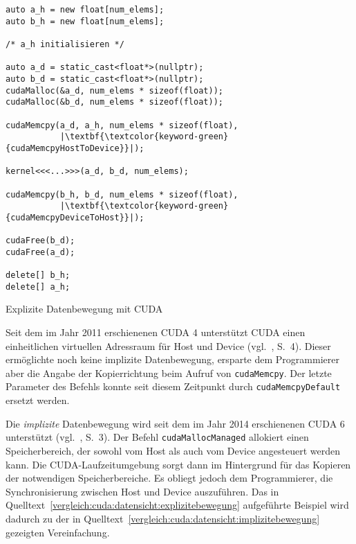 \begin{code}
    \begin{verbatim}
auto a_h = new float[num_elems];
auto b_h = new float[num_elems];

/* a_h initialisieren */

auto a_d = static_cast<float*>(nullptr);
auto b_d = static_cast<float*>(nullptr);
cudaMalloc(&a_d, num_elems * sizeof(float));
cudaMalloc(&b_d, num_elems * sizeof(float));

cudaMemcpy(a_d, a_h, num_elems * sizeof(float),
           |\textbf{\textcolor{keyword-green}{cudaMemcpyHostToDevice}}|);

kernel<<<...>>>(a_d, b_d, num_elems);

cudaMemcpy(b_h, b_d, num_elems * sizeof(float),
           |\textbf{\textcolor{keyword-green}{cudaMemcpyDeviceToHost}}|);

cudaFree(b_d);
cudaFree(a_d);

delete[] b_h;
delete[] a_h;
    \end{verbatim}
    \caption{Explizite Datenbewegung mit CUDA}
    \label{vergleich:cuda:datensicht:explizitebewegung}
\end{code}

Seit dem im Jahr 2011 erschienenen CUDA 4 unterstützt CUDA einen einheitlichen
virtuellen Adressraum für Host und Device (vgl.~\cite{cuda2011}, S.\ 4). Dieser
ermöglichte noch keine implizite Datenbewegung, ersparte dem Programmierer
aber die Angabe der Kopierrichtung beim Aufruf von
\texttt{cudaMemcpy}. Der letzte Parameter des Befehls konnte seit
diesem Zeitpunkt durch \texttt{cudaMemcpyDefault} ersetzt werden.

Die \textit{implizite} Datenbewegung wird seit dem im Jahr 2014 erschienenen
CUDA 6 unterstützt (vgl.~\cite{cuda2014}, S.\ 3). Der Befehl
\texttt{cudaMallocManaged} allokiert einen Speicherbereich, der sowohl
vom Host als auch vom Device angesteuert werden kann. Die CUDA-Laufzeitumgebung
sorgt dann im Hintergrund für das Kopieren der notwendigen Speicherbereiche. Es
obliegt jedoch dem Programmierer, die Synchronisierung zwischen Host und Device
auszuführen. Das in Quelltext~\ref{vergleich:cuda:datensicht:explizitebewegung}
aufgeführte Beispiel wird dadurch zu der in
Quelltext~\ref{vergleich:cuda:datensicht:implizitebewegung} gezeigten
Vereinfachung.

